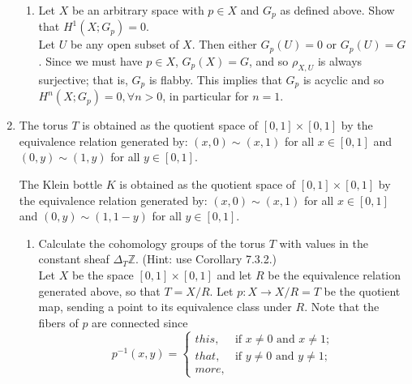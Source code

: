 \documentclass{article}
\newcommand{\zed}{\mathbb Z}
\begin{document}
\begin{enumerate}
\begin{enumerate}
\item Let $X$ be an arbitrary space with $p\in X$ and $G_p$ as defined above.
Show that $H^1(X;G_p)=0$.\\

Let $U$ be any open subset of $X$. Then either $G_p(U)=0$ or $G_p(U)=G$. Since we must have $p \in X$, $G_p(X)=G$, and so $\rho_{X,U}$ is always surjective; that is, $G_p$ is flabby.  This implies that $G_p$ is acyclic and so $H^n(X;G_p)=0, \forall n >0$, in particular for $n=1$.
\end{enumerate}
\newpage
\item
The torus $T$ is obtained as the quotient space of $[0,1]\times[0,1]$ by the equivalence relation generated by: 
$(x,0)\sim (x,1)$ for all $x\in [0,1]$ and $(0,y)\sim(1,y)$ for all $y\in [0,1]$.

The Klein bottle $K$ is obtained as the quotient space of $[0,1]\times[0,1]$ by the equivalence relation generated by: 
$(x,0)\sim (x,1)$ for all $x\in [0,1]$ and $(0,y)\sim(1,1-y)$ for all $y\in [0,1]$.
\begin{enumerate}
\item
Calculate the cohomology groups of the torus $T$ with values in the constant sheaf $\Delta_T\zed$. (Hint: use Corollary 7.3.2.)\\


Let $X$ be the space $[0,1]\times[0,1]$ and let $R$ be the equivalence relation generated above, so that $T = X/R$. Let $p: X \rightarrow X/R=T$ be the quotient map, sending a point to its equivalence class under $R$. Note that the fibers of $p$ are connected since 
\[p^{-1}(x,y)= 
\begin{cases}
this, & \text{if } x \neq 0 \text{ and } x \neq 1;\\
that, & \text{if } y \neq 0 \text{ and } y \neq 1;\\
more, &

\end{cases}\] \\



\end{enumerate}
\end{enumerate}
\end{document}
